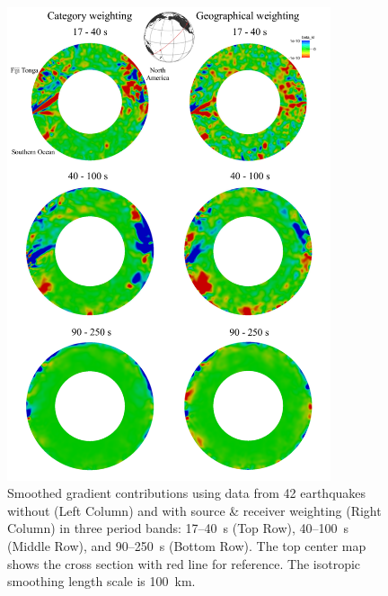 \begin{figure}
\centering
\includegraphics[width=0.85\textwidth]{ch-weighting/figures/Figure-10-small.pdf}
  \caption[Smoothed gradient contributions w/ and w/o weightings applied]
  {\small{Smoothed gradient contributions using data from 42 earthquakes without (Left Column) 
and with source \& receiver weighting (Right Column) in three
period bands: 17--40~s (Top Row), 40--100~s (Middle Row), and 90--250~s (Bottom Row). The top center map shows the cross section with red line for reference.   
The isotropic smoothing length scale is 100~km.
}}
\label{fig:gradient_category}
\end{figure}

